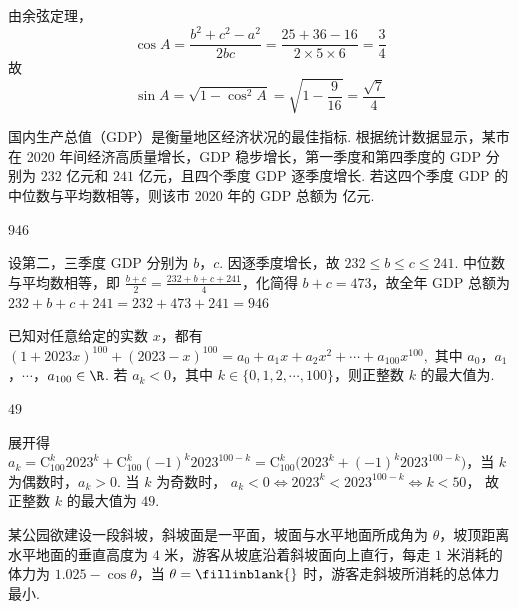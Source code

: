\begin{solution}
由余弦定理，
\[
\cos A=\frac{b^2+c^2-a^2}{2bc}
=\frac{25+36-16}{2\times 5\times 6}
=\frac34
\]
故
\[
\sin A=\sqrt{1-\cos^2 A}=\sqrt{1-\frac{9}{16}}=\frac{\sqrt7}{4}
\]
\end{solution}

\begin{problem}
国内生产总值（GDP）是衡量地区经济状况的最佳指标. 根据统计数据显示，某市在 2020 年间经济高质量增长，GDP 稳步增长，第一季度和第四季度的 GDP 分别为 \(232\) 亿元和 \(241\) 亿元，且四个季度 GDP 逐季度增长. 若这四个季度 GDP 的中位数与平均数相等，则该市 2020 年的 GDP 总额为\fillinblank{} 亿元.
\end{problem}

\begin{answer}
\(946\)
\end{answer}

\begin{solution}
设第二，三季度 GDP 分别为 \(b\)，\(c\). 因逐季度增长，故 \(232\le b\le c\le 241\). 中位数与平均数相等，即
\(\frac{b+c}{2}=\frac{232+b+c+241}{4}\)，化简得 \(b+c=473\)，故全年 GDP 总额为
\(232+b+c+241=232+473+241=946\)
\end{solution}

\begin{problem}
已知对任意给定的实数 \(x\)，都有
\(
\left(1+2023x\right)^{100}+\left(2023-x\right)^{100}=a_0+a_1x+a_2x^2+\cdots+a_{100}x^{100},
\)
其中 \(a_0\)，\(a_1\)，\(\cdots\)，\(a_{100}\in\R\). 若 \(a_k<0\)，其中 \(k\in\{0,1,2,\cdots,100\}\)，则正整数 \(k\) 的最大值为\fillinblank{}.
\end{problem}

\begin{answer}
\(49\)
\end{answer}

\begin{solution}
展开得 \(a_k=\mathrm C_{100}^{k}2023^k+\mathrm C_{100}^{k}(-1)^k2023^{100-k}=\mathrm C_{100}^{k}\bigl(2023^k+(-1)^k2023^{100-k}\bigr)\)，当 \(k\) 为偶数时，\(a_k>0\). 当 \(k\) 为奇数时，
\(a_k<0\iff 2023^k<2023^{100-k}\iff k<50\)，
故正整数 \(k\) 的最大值为 \(49\).
\end{solution}

\begin{problem}
某公园欲建设一段斜坡，斜坡面是一平面，坡面与水平地面所成角为 \(\theta\)，坡顶距离水平地面的垂直高度为 \(4\) 米，游客从坡底沿着斜坡面向上直行，每走 \(1\) 米消耗的体力为 \(1.025-\cos\theta\)，当 \(\theta=\fillinblank{}\) 时，游客走斜坡所消耗的总体力最小.
\end{problem}

